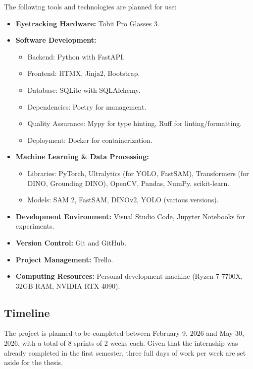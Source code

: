 \documentclass[english]{hogent-article}
\begin{document}
The following tools and technologies are planned for use:
\begin{itemize}
    \item \textbf{Eyetracking Hardware:} Tobii Pro Glasses 3.
    \item \textbf{Software Development:}
        \begin{itemize}
            \item Backend: Python with FastAPI.
            \item Frontend: HTMX, Jinja2, Bootstrap.
            \item Database: SQLite with SQLAlchemy.
            \item Dependencies: Poetry for management.
            \item Quality Assurance: Mypy for type hinting, Ruff for linting/formatting.
            \item Deployment: Docker for containerization.
        \end{itemize}
    \item \textbf{Machine Learning \& Data Processing:}
        \begin{itemize}
            \item Libraries: PyTorch, Ultralytics (for YOLO, FastSAM), Transformers (for DINO, Grounding DINO), OpenCV, Pandas, NumPy, scikit-learn.
            \item Models: SAM 2, FastSAM, DINOv2, YOLO (various versions).
        \end{itemize}
    \item \textbf{Development Environment:} Visual Studio Code, Jupyter Notebooks for experiments.
    \item \textbf{Version Control:} Git and GitHub.
    \item \textbf{Project Management:} Trello.
    \item \textbf{Computing Resources:} Personal development machine (Ryzen 7 7700X, 32GB RAM, NVIDIA RTX 4090).
\end{itemize}

\subsection{Timeline}

The project is planned to be completed between February 9, 2026 and May 30, 2026, with a total of 8 sprints of 2 weeks each.
Given that the internship was already completed in the first semester, three full days of work per week are set aside for the thesis.
\end{document}
